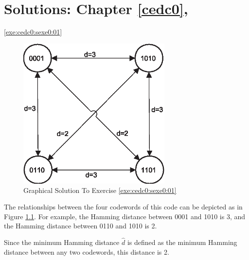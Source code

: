 
\chapter[Solutions: \cedczeroxrefcomma{}Chapter \ref{cedc0}]
        {Solutions: \cedczeroxrefcomma{}Chapter \ref{cedc0}, \cedczerolongtitle{}}

\label{ceds0}

\vworkexercisechapterheader{}


\begin{vworkexercisesolution}{\ref{exe:cedc0:sexe0:01}}

\begin{figure}
\centering
\includegraphics[height=3.0in]{c_eds0/exe001.eps}
\caption{Graphical Solution To Exercise \ref{exe:cedc0:sexe0:01}}
\label{fig:ceds0:exe01:01}
\end{figure}

The relationships between the four codewords of this code can be
depicted as in Figure \ref{fig:ceds0:exe01:01}.  For example,
the Hamming distance between 0001 and 1010 is 3, and the
Hamming distance between 0110 and 1010 is 2.

Since the minimum Hamming distance $\hat{d}$ is defined as the minimum
Hamming distance between any two codewords, this distance is 2.

\end{vworkexercisesolution}

